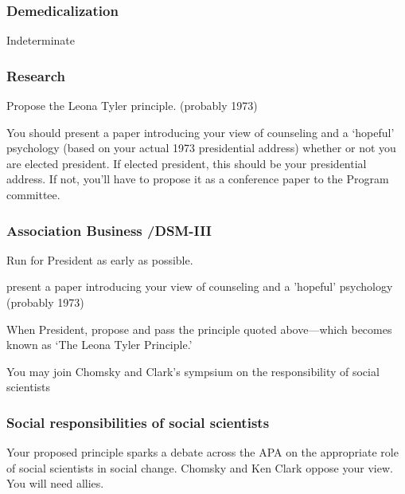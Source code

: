 \begin{refsection}
\subsubsection{Demedicalization}
\label{demedicalization}

Indeterminate

\subsubsection{Research}
\label{research}

\begin{proposal}[Tyler]\label{proposal:tyler}
Propose the Leona Tyler principle. (probably 1973)
\end{proposal}

You should present a paper introducing your view of counseling and a `hopeful' psychology (based on your actual 1973 presidential address) whether or not you are elected president. If elected president, this should be your presidential address. If not, you'll have to propose it as a conference paper to the Program committee.

\subsubsection{Association Business \slash  DSM-III}
\label{associationbusinessdsm-iii}

Run for President as early as possible.
\begin{writingtask}[Tyler]\label{writingtask:tyler}
present a paper introducing your view of counseling and a 'hopeful' psychology (probably 1973)
\end{writingtask}
When President, propose and pass the principle quoted above---which becomes known as ‘The Leona Tyler Principle.’\\
\begin{writingtask}[Tyler]\label{writingtask:tylerB}
You may join Chomsky and Clark’s sympsium on the responsibility of social scientists
\end{writingtask}

\subsubsection{Social responsibilities of social scientists}
\label{socialresponsibilitiesofsocialscientists}

Your proposed principle sparks a debate across the APA on the appropriate role of social scientists in social change. Chomsky and Ken Clark oppose your view. You will need allies.


\end{refsection}
